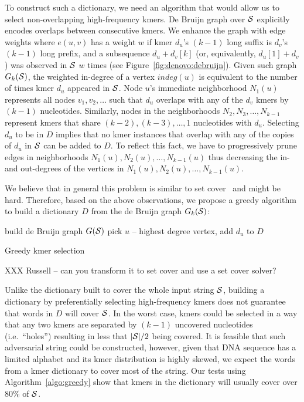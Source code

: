 \documentclass[12pt]{cmuthesis}
\makeatletter
\newcommand{\ie}{i.e.\@}
\makeatother
\begin{document}
  To construct such a dictionary, we need an algorithm that would allow us to select non-overlapping high-frequency kmers. De Bruijn graph over $\mathcal{S}$ explicitly encodes overlaps between consecutive kmers. We enhance the graph with edge weights where $e(u,v)$ has a weight $w$ if kmer $d_u$'s $(k-1)$ long suffix is $d_v$'s $(k-1)$ long prefix, and a subsequence $d_u + d_v[k]$ (or, equivalently, $d_u[1] + d_v$) was observed in $\mathcal{S}$ $w$ times (see Figure~\ref{fig:denovo:debruijn}). Given such graph $G_k(\mathcal{S})$, the weighted in-degree of a vertex $indeg(u)$ is equivalent to the number of times kmer $d_u$ appeared in $\mathcal{S}$. Node $u$'s immediate neighborhood $N_1(u)$ represents all nodes $v_1, v_2, \ldots$ such that $d_u$ overlaps with any of the $d_v$ kmers by $(k-1)$ nucleotides. Similarly, nodes in the neighborhoods $N_2, N_3, \ldots, N_{k-1}$ represent kmers that share $(k-2), (k-3), \ldots, 1$ nucleotides with $d_u$. Selecting $d_u$ to be in $D$ implies that no kmer instances that overlap with any of the copies of $d_u$ in $\mathcal{S}$ can be added to $D$. To reflect this fact, we have to progressively prune edges in neighborhoods $N_1(u), N_2(u), \ldots, N_{k-1}(u)$ thus decreasing the in- and out-degrees of the vertices in $N_1(u), N_2(u), \ldots, N_{k-1}(u)$. 

  We believe that in general this problem is similar to set cover~\cite{SetCoverIsHard} and might be hard. Therefore, based on the above observations, we propose a greedy algorithm to build a dictionary $D$ from the de Bruijn graph $G_k(\mathcal{S})$:
  
  \begin{algorithm}[H]
   build de Bruijn graph $G(\mathcal{S})$\;
   pick $u$ -- highest degree vertex, add $d_u$ to $D$\;
   \caption{Greedy kmer selection}
   \label{algo:greedy}
  \end{algorithm}

  XXX Russell -- can you transform it to set cover and use a set cover solver?

  Unlike the dictionary built to cover the whole input string $\mathcal{S}$, building a dictionary by preferentially selecting high-frequency kmers does not guarantee that words in $D$ will cover $\mathcal{S}$. In the worst case, kmers could be selected in a way that any two kmers are separated by $(k-1)$ uncovered nucleotides (\ie~``holes'') resulting in less that $|\mathcal{S}| / 2$ being covered. It is feasible that such adversarial string could be constructed, however, given that DNA sequence has a limited alphabet and its kmer distribution is highly skewed, we expect the words from a kmer dictionary to cover most of the string. Our tests using Algorithm~\ref{algo:greedy} show that kmers in the dictionary will usually cover over $80\%$ of $\mathcal{S}$.
\end{document}
